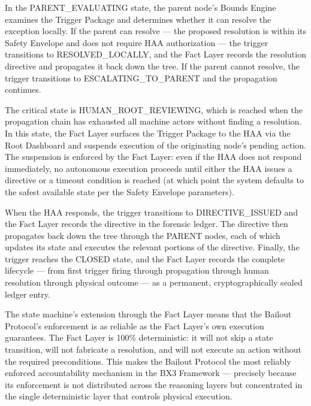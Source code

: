 In the PARENT\_EVALUATING state, the parent node's Bounds Engine examines the Trigger Package and determines whether it can resolve the exception locally. If the parent can resolve — the proposed resolution is within its Safety Envelope and does not require HAA authorization — the trigger transitions to RESOLVED\_LOCALLY, and the Fact Layer records the resolution directive and propagates it back down the tree. If the parent cannot resolve, the trigger transitions to ESCALATING\_TO\_PARENT and the propagation continues.

The critical state is HUMAN\_ROOT\_REVIEWING, which is reached when the propagation chain has exhausted all machine actors without finding a resolution. In this state, the Fact Layer surfaces the Trigger Package to the HAA via the Root Dashboard and suspends execution of the originating node's pending action. The suspension is enforced by the Fact Layer: even if the HAA does not respond immediately, no autonomous execution proceeds until either the HAA issues a directive or a timeout condition is reached (at which point the system defaults to the safest available state per the Safety Envelope parameters).

When the HAA responds, the trigger transitions to DIRECTIVE\_ISSUED and the Fact Layer records the directive in the forensic ledger. The directive then propagates back down the tree through the PARENT nodes, each of which updates its state and executes the relevant portions of the directive. Finally, the trigger reaches the CLOSED state, and the Fact Layer records the complete lifecycle — from first trigger firing through propagation through human resolution through physical outcome — as a permanent, cryptographically sealed ledger entry.

The state machine's extension through the Fact Layer means that the Bailout Protocol's enforcement is as reliable as the Fact Layer's own execution guarantees. The Fact Layer is 100\% deterministic: it will not skip a state transition, will not fabricate a resolution, and will not execute an action without the required preconditions. This makes the Bailout Protocol the most reliably enforced accountability mechanism in the BX3 Framework — precisely because its enforcement is not distributed across the reasoning layers but concentrated in the single deterministic layer that controls physical execution.


